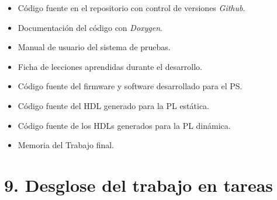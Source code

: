 \documentclass[
11pt, %
]{charter}
\begin{document}
\begin{itemize}
	\item Código fuente en el repositorio con control de versiones \emph{Github}.
	\item Documentación del código con \emph{Doxygen}.
	\item Manual de usuario del sistema de pruebas.
	\item Ficha de lecciones aprendidas durante el desarrollo.
	\item Código fuente del firmware y software desarrollado para el PS.
	\item Código fuente del HDL generado para la PL estática.
	\item Código fuente de los HDLs generados para la PL dinámica.
	\item Memoria del Trabajo final.
\end{itemize}

\newpage

\section{9. Desglose del trabajo en tareas}
\label{sec:wbs}
\end{document}
